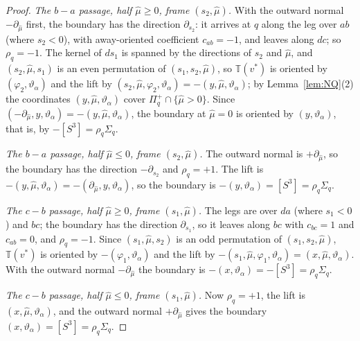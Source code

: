 \begin{proof}
\emph{The $b-a$ passage, half $\hat\mu\ge0$, frame $(s_2,\hat\mu)$.} With the outward normal $-\partial_{\hat\mu}$ first, the
boundary has the direction $\partial_{s_2}$: it arrives at $q$ along the leg over $ab$ (where $s_2<0$), with away-oriented
coefficient $c_{ab}=-1$, and leaves along $dc$; so $\rho_q=-1$. The kernel of $ds_1$ is spanned by the directions of $s_2$
and $\hat\mu$, and $(s_2,\hat\mu,s_1)$ is an even permutation of $(s_1,s_2,\hat\mu)$, so $\mathbb T(v^*)$ is oriented by
$(\varphi_2,\vartheta_\alpha)$ and the lift by $(s_2,\hat\mu,\varphi_2,\vartheta_\alpha)=-(y,\hat\mu,\vartheta_\alpha)$; by
Lemma~\ref{lem:NQ}(2) the coordinates $(y,\hat\mu,\vartheta_\alpha)$ cover $\Pi_q^+\cap\{\hat\mu>0\}$. Since
$(-\partial_{\hat\mu},y,\vartheta_\alpha)=-(y,\hat\mu,\vartheta_\alpha)$, the boundary at $\hat\mu=0$ is oriented by
$(y,\vartheta_\alpha)$, that is, by $-[S^3]=\rho_q\Sigma_q$.

\emph{The $b-a$ passage, half $\hat\mu\le0$, frame $(s_2,\hat\mu)$.} The outward normal is $+\partial_{\hat\mu}$, so the boundary
has the direction $-\partial_{s_2}$ and $\rho_q=+1$. The lift is
$-(y,\hat\mu,\vartheta_\alpha)=-(\partial_{\hat\mu},y,\vartheta_\alpha)$, so the boundary is $-(y,\vartheta_\alpha)=[S^3]=\rho_q\Sigma_q$.

\emph{The $c-b$ passage, half $\hat\mu\ge0$, frame $(s_1,\hat\mu)$.} The legs are over $da$ (where $s_1<0$) and $bc$; the
boundary has the direction $\partial_{s_1}$, so it leaves along $bc$ with $c_{bc}=1$ and $c_{ab}=0$, and $\rho_q=-1$. Since
$(s_1,\hat\mu,s_2)$ is an odd permutation of $(s_1,s_2,\hat\mu)$, $\mathbb T(v^*)$ is oriented by
$-(\varphi_1,\vartheta_\alpha)$ and the lift by $-(s_1,\hat\mu,\varphi_1,\vartheta_\alpha)=(x,\hat\mu,\vartheta_\alpha)$. With the
outward normal $-\partial_{\hat\mu}$ the boundary is $-(x,\vartheta_\alpha)=-[S^3]=\rho_q\Sigma_q$.

\emph{The $c-b$ passage, half $\hat\mu\le0$, frame $(s_1,\hat\mu)$.} Now $\rho_q=+1$, the lift is $(x,\hat\mu,\vartheta_\alpha)$,
and the outward normal $+\partial_{\hat\mu}$ gives the boundary $(x,\vartheta_\alpha)=[S^3]=\rho_q\Sigma_q$.
\end{proof}

